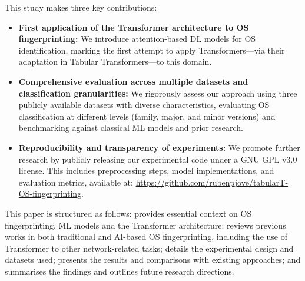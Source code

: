 This study makes three key contributions:  
\begin{itemize}  
    \item \textbf{First application of the Transformer architecture to OS fingerprinting:} We introduce attention-based DL models for OS identification, marking the first attempt to apply Transformers—via their adaptation in Tabular Transformers—to this domain.  
    \item \textbf{Comprehensive evaluation across multiple datasets and classification granularities:} We rigorously assess our approach using three publicly available datasets with diverse characteristics, evaluating OS classification at different levels (family, major, and minor versions) and benchmarking against classical ML models and prior research.  
    \item \textbf{Reproducibility and transparency of experiments:} We promote further research by publicly releasing our experimental code under a GNU GPL v3.0 license. This includes preprocessing steps, model implementations, and evaluation metrics, available at: \url{https://github.com/rubenpjove/tabularT-OS-fingerprinting}.  
\end{itemize}  

This paper is structured as follows:  provides essential context on OS fingerprinting, ML models and the Transformer architecture;  reviews previous works in both traditional and AI-based OS fingerprinting, including the use of Transformer to other network-related tasks;  details the experimental design and datasets used;  presents the results and comparisons with existing approaches; and  summarises the findings and outlines future research directions.

\clearpage